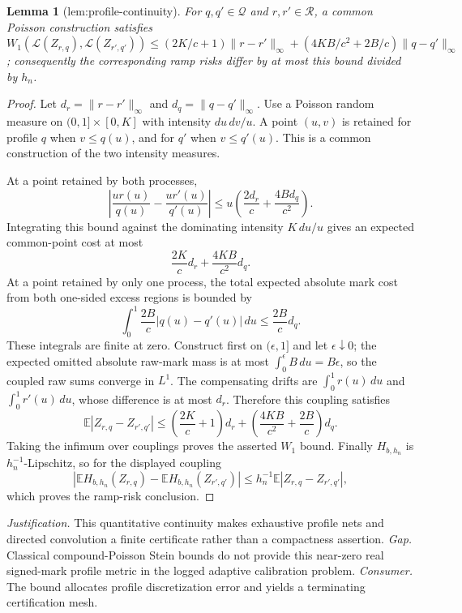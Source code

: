 \documentclass{article}
\newtheorem{lemma}{Lemma}
\begin{document}
\begin{lemma}[lem:profile-continuity]\label{lem:profile-continuity}
For \(q,q'\in\mathcal Q\) and \(r,r'\in\mathcal R\), a common Poisson construction satisfies \(W_1(\mathcal L(Z_{r,q}),\mathcal L(Z_{r',q'}))\le(2K/c+1)\|r-r'\|_{\infty}+(4KB/c^2+2B/c)\|q-q'\|_{\infty}\); consequently the corresponding ramp risks differ by at most this bound divided by \(h_n\).
\end{lemma}
\begin{proof}
Let \(d_r=\|r-r'\|_\infty\) and \(d_q=\|q-q'\|_\infty\).
Use a Poisson random measure on
\((0,1]\times[0,K]\) with intensity \(du\,dv/u\).  A point \((u,v)\) is retained for profile \(q\) when \(v\leq q(u)\), and for \(q'\) when \(v\leq q'(u)\).  This is a common construction of the two intensity measures.

At a point retained by both processes,
\[
 \left|\frac{ur(u)}{q(u)}-\frac{ur'(u)}{q'(u)}\right|
 \leq u\left(\frac{2d_r}{c}+\frac{4B d_q}{c^2}\right).
\]
Integrating this bound against the dominating intensity \(K\,du/u\) gives an expected common-point cost at most
\[
 \frac{2K}{c}d_r+\frac{4KB}{c^2}d_q.
\]
At a point retained by only one process, the total expected absolute mark cost from both one-sided excess regions is bounded by
\[
 \int_0^1\frac{2B}{c}|q(u)-q'(u)|\,du
 \leq\frac{2B}{c}d_q.
\]
These integrals are finite at zero.  Construct first on \((\epsilon,1]\) and let
\(\epsilon\downarrow0\); the expected omitted absolute raw-mark mass is at most
\(\int_0^\epsilon B\,du=B\epsilon\), so the coupled raw sums converge in \(L^1\).
The compensating drifts are \(\int_0^1r(u)\,du\) and
\(\int_0^1r'(u)\,du\), whose difference is at most \(d_r\).
Therefore this coupling satisfies
\[
 \mathbb E|Z_{r,q}-Z_{r',q'}|
 \leq\left(\frac{2K}{c}+1\right)d_r
 +\left(\frac{4KB}{c^2}+\frac{2B}{c}\right)d_q.
\]
Taking the infimum over couplings proves the asserted \(W_1\) bound.
Finally \(H_{b,h_n}\) is \(h_n^{-1}\)-Lipschitz, so for the displayed coupling
\[
 \left|\mathbb EH_{b,h_n}(Z_{r,q})
       -\mathbb EH_{b,h_n}(Z_{r',q'})\right|
 \leq h_n^{-1}\mathbb E|Z_{r,q}-Z_{r',q'}|,
\]
which proves the ramp-risk conclusion.
\end{proof}
\par\smallskip\noindent \textit{Justification.} This quantitative continuity makes exhaustive profile nets and directed convolution a finite certificate rather than a compactness assertion. \textit{Gap.} Classical compound-Poisson Stein bounds do not provide this near-zero real signed-mark profile metric in the logged adaptive calibration problem. \textit{Consumer.} The bound allocates profile discretization error and yields a terminating certification mesh.
\end{document}
